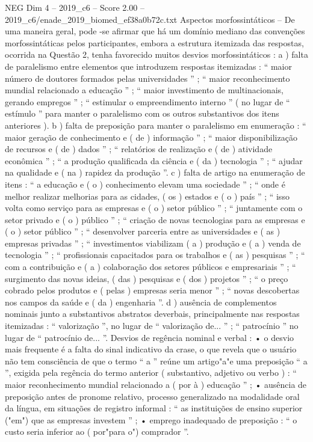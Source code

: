 \begin{textsample}{NEG Dim 4 – 2019\_c6 – Score 2.00 – 2019\_c6/enade\_2019\_biomed\_ef38a0b72c.txt}
Aspectos morfossintáticos – De uma maneira geral, pode -se afirmar que há um domínio mediano das convenções morfossintáticas pelos participantes, embora a estrutura itemizada das respostas, ocorrida na Questão 2, tenha favorecido muitos desvios morfossintáticos : a ) falta de paralelismo entre elementos que introduzem respostas itemizadas : “ maior número de doutores formados pelas universidades ” ; “ maior reconhecimento mundial relacionado a educação ” ; “ maior investimento de multinacionais, gerando empregos ” ; “ estimular o empreendimento interno ” ( no lugar de “ estímulo ” para manter o paralelismo com os outros substantivos dos itens anteriores ). b ) falta de preposição para manter o paralelismo em enumeração : “ maior geração de conhecimento e ( de ) informação ” ; “ maior disponibilização de recursos e ( de ) dados ” ; “ relatórios de realização e ( de ) atividade econômica ” ; “ a produção qualificada da ciência e ( da ) tecnologia ” ; “ ajudar na qualidade e ( na ) rapidez da produção ”. c ) falta de artigo na enumeração de itens : “ a educação e ( o ) conhecimento elevam uma sociedade ” ; “ onde é melhor realizar melhorias para as cidades, ( os ) estados e ( o ) país ” ; “ isso volta como serviço para as empresas e ( o ) setor público ” ; “ juntamente com o setor privado e ( o ) público ” ; “ criação de novas tecnologias para as empresas e ( o ) setor público ” ; “ desenvolver parceria entre as universidades e ( as ) empresas privadas ” ; “ investimentos viabilizam ( a ) produção e ( a ) venda de tecnologia ” ; “ profissionais capacitados para os trabalhos e ( as ) pesquisas ” ; “ com a contribuição e ( a ) colaboração dos setores públicos e empresariais ” ; “ surgimento das novas ideias, ( das ) pesquisas e ( dos ) projetos ” ; “ o preço cobrado pelos produtos e ( pelas ) empresas seria menor ” ; “ novas descobertas nos campos da saúde e ( da ) engenharia ”. d ) ausência de complementos nominais junto a substantivos abstratos deverbais, principalmente nas respostas itemizadas : “ valorização ”, no lugar de “ valorização de... ” ; “ patrocínio ” no lugar de “ patrocínio de... ”.
Desvios de regência nominal e verbal : • o desvio mais frequente é a falta do sinal indicativo da crase, o que revela que o usuário não tem consciência de que o termo “ a ” reúne um artigo"a"e uma preposição “ a ”, exigida pela regência do termo anterior ( substantivo, adjetivo ou verbo ) : “ maior reconhecimento mundial relacionado a ( por à ) educação ” ; • ausência de preposição antes de pronome relativo, processo generalizado na modalidade oral da língua, em situações de registro informal : “ as instituições de ensino superior ("em") que as empresas investem ” ; • emprego inadequado de preposição : “ o custo seria inferior ao ( por"para o") comprador ”.

\end{textsample}
